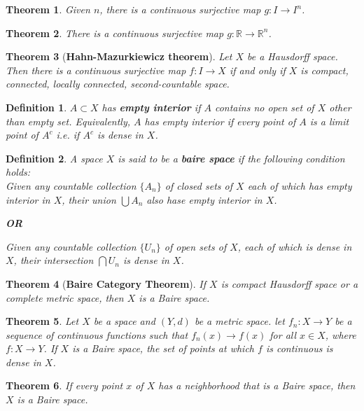 \documentclass[answers, a4paper, 12pt]{exam}
\newtheorem{theorem}{Theorem}[section]
\newtheorem{definition}{Definition}
\newcommand{\R}{\mathbb{R}}
\begin{document}
\begin{theorem}
    Given $n$, there is a continuous surjective map $g:I\to I^n$.
\end{theorem}

\begin{theorem}
    There is a continuous surjective map $g:\R\to \R^n$.
\end{theorem}

\begin{theorem}[\textbf{Hahn-Mazurkiewicz theorem}]
    Let $X$ be a Hausdorff space. Then there is a continuous surjective map $f:I\to X$ if and only if $X$ is compact, connected, locally connected, second-countable space.
\end{theorem}

\begin{definition}
    $A\subset X$ has \textbf{empty interior} if $A$ contains no open set of $X$ other than empty set. Equivalently, $A$ has empty interior if every point of $A$ is a limit point of $A^c$ i.e. if $A^c$ is dense in $X$.
\end{definition}

\begin{definition}
    A space $X$ is said to be a \textbf{baire space} if the following condition holds:\\
    Given any countable collection $\{A_n\}$ of closed sets of $X$ each of which has empty interior in $X$, their union $\bigcup{A_n}$ also hase empty interior in $X$.
    \begin{center}
        \textbf{OR}
    \end{center}
    Given any countable collection $\{U_n\}$ of open sets of $X$, each of which is dense in $X$, their intersection $\bigcap{U_n}$ is dense in $X$.
\end{definition}

\begin{theorem}[\textbf{Baire Category Theorem}]
    If $X$ is compact Hausdorff space or a complete metric space, then $X$ is a Baire space.
\end{theorem}

\begin{theorem}
    Let $X$ be a space and $(Y,d)$ be a metric space. let $f_n:X\to Y$ be a sequence of continuous functions such that $f_n(x)\to f(x)$ for all $x\in X$, where $f:X\to Y$. If $X$ is a Baire space, the set of points at which $f$ is continuous is dense in $X$.
\end{theorem}

\begin{theorem}
    If every point $x$ of $X$ has a neighborhood that is a Baire space, then $X$ is a Baire space.
\end{theorem}
\end{document}
